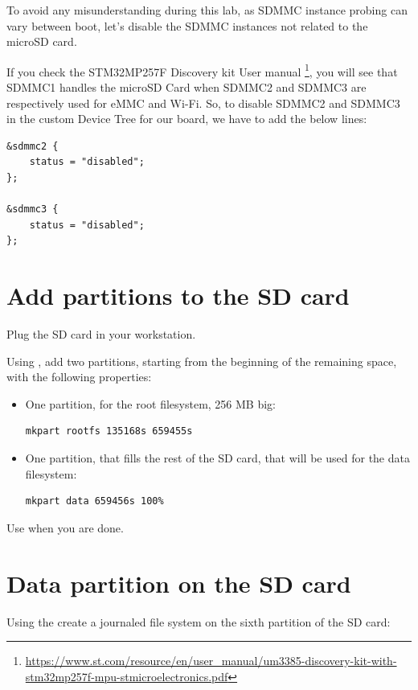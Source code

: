 To avoid any misunderstanding during this lab,
as SDMMC instance probing can vary between boot,
let's disable the SDMMC instances not related to the microSD card.

If you check the STM32MP257F Discovery kit User manual
\footnote{\url{https://www.st.com/resource/en/user_manual/um3385-discovery-kit-with-stm32mp257f-mpu-stmicroelectronics.pdf}},
you will see that SDMMC1 handles the microSD Card when SDMMC2 and SDMMC3
are respectively used for eMMC and Wi-Fi.
So, to disable SDMMC2 and SDMMC3 in the custom Device Tree for our board,
we have to add the below lines:

\begin{verbatim}
&sdmmc2 {
	status = "disabled";
};

&sdmmc3 {
	status = "disabled";
};
\end{verbatim}

\section{Add partitions to the SD card}

Plug the SD card in your workstation.

Using , add two partitions, starting from the beginning
of the remaining space, with the following properties:
\begin{itemize}

\item One partition, for the root filesystem, 256 MB big:
\begin{verbatim}
mkpart rootfs 135168s 659455s
\end{verbatim}

\item One partition, that fills the rest of the SD card, that will be
  used for the data filesystem:
\begin{verbatim}
mkpart data 659456s 100%
\end{verbatim}
\end{itemize}

Use  when you are done.

\section{Data partition on the SD card}

Using the  create a journaled file system on the
sixth partition of the SD card:


